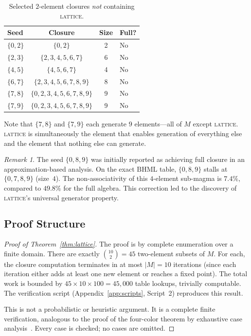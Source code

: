 \documentclass[11pt,a4paper]{article}
\theoremstyle{definition}
\theoremstyle{remark}
\newtheorem{remark}[theorem]{Remark}
\newcommand{\BHML}{\mathrm{BHML}}
\begin{document}
\begin{table}[ht]
\centering
\caption{Selected $2$-element closures \emph{not} containing \textsc{lattice}.}\label{tab:non-lattice}
\begin{tabular}{lccl}
\toprule
Seed & Closure & Size & Full? \\
\midrule
$\{0,2\}$ & $\{0,2\}$ & 2 & No \\
$\{2,3\}$ & $\{2,3,4,5,6,7\}$ & 6 & No \\
$\{4,5\}$ & $\{4,5,6,7\}$ & 4 & No \\
$\{6,7\}$ & $\{2,3,4,5,6,7,8,9\}$ & 8 & No \\
$\{7,8\}$ & $\{0,2,3,4,5,6,7,8,9\}$ & 9 & No \\
$\{7,9\}$ & $\{0,2,3,4,5,6,7,8,9\}$ & 9 & No \\
\bottomrule
\end{tabular}
\end{table}

Note that $\{7,8\}$ and $\{7,9\}$ each generate $9$ elements---all of $M$ except \textsc{lattice}. \textsc{lattice} is simultaneously the element that enables generation of everything else and the element that nothing else can generate.

\begin{remark}\label{rem:089}
The seed $\{0,8,9\}$ was initially reported as achieving full closure in an approximation-based analysis. On the exact $\BHML$ table, $\{0,8,9\}$ stalls at $\{0,7,8,9\}$ (size~$4$). The non-associativity of this $4$-element sub-magma is $7.4\%$, compared to $49.8\%$ for the full algebra. This correction led to the discovery of \textsc{lattice}'s universal generator property.
\end{remark}

\subsection{Proof Structure}\label{sec:proof-structure}

\begin{proof}[Proof of Theorem~\ref{thm:lattice}]
The proof is by complete enumeration over a finite domain. There are exactly $\binom{10}{2}=45$ two-element subsets of $M$. For each, the closure computation terminates in at most $|M|=10$ iterations (since each iteration either adds at least one new element or reaches a fixed point). The total work is bounded by $45\times 10\times 100 = 45{,}000$ table lookups, trivially computable. The verification script (Appendix~\ref{app:scripts}, Script~2) reproduces this result.

This is not a probabilistic or heuristic argument. It is a complete finite verification, analogous to the proof of the four-color theorem by exhaustive case analysis~\cite{AppelHaken1977}. Every case is checked; no cases are omitted.
\end{proof}
\end{document}
